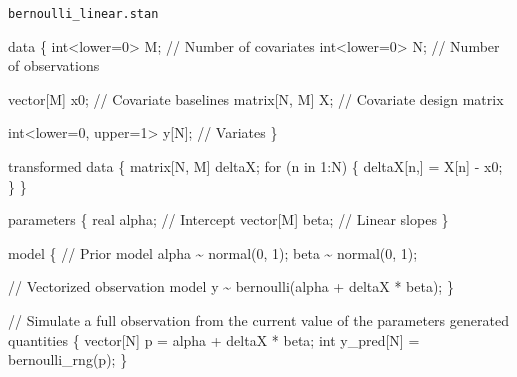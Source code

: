 \documentclass[
  letterpaper,
  DIV=11,
  numbers=noendperiod]{scrartcl}
\newenvironment{Shaded}{\begin{snugshade}}{\end{snugshade}}
\newcommand{\CommentTok}[1]{\textcolor[rgb]{0.37,0.37,0.37}{#1}}
\newcommand{\ControlFlowTok}[1]{\textcolor[rgb]{0.00,0.23,0.31}{#1}}
\newcommand{\DataTypeTok}[1]{\textcolor[rgb]{0.68,0.00,0.00}{#1}}
\newcommand{\DecValTok}[1]{\textcolor[rgb]{0.68,0.00,0.00}{#1}}
\newcommand{\KeywordTok}[1]{\textcolor[rgb]{0.00,0.23,0.31}{#1}}
\newcommand{\NormalTok}[1]{\textcolor[rgb]{0.00,0.23,0.31}{#1}}
\begin{document}
\begin{codelisting}

\caption{\texttt{bernoulli\_linear.stan}}

\begin{Shaded}
\begin{Highlighting}[]
\KeywordTok{data}\NormalTok{ \{}
  \DataTypeTok{int}\NormalTok{\textless{}}\KeywordTok{lower}\NormalTok{=}\DecValTok{0}\NormalTok{\textgreater{} M; }\CommentTok{// Number of covariates}
  \DataTypeTok{int}\NormalTok{\textless{}}\KeywordTok{lower}\NormalTok{=}\DecValTok{0}\NormalTok{\textgreater{} N; }\CommentTok{// Number of observations}
  
  \DataTypeTok{vector}\NormalTok{[M] x0;   }\CommentTok{// Covariate baselines}
  \DataTypeTok{matrix}\NormalTok{[N, M] X; }\CommentTok{// Covariate design matrix}
  
  \DataTypeTok{int}\NormalTok{\textless{}}\KeywordTok{lower}\NormalTok{=}\DecValTok{0}\NormalTok{, }\KeywordTok{upper}\NormalTok{=}\DecValTok{1}\NormalTok{\textgreater{} y[N]; }\CommentTok{// Variates}
\NormalTok{\}}

\KeywordTok{transformed data}\NormalTok{ \{}
  \DataTypeTok{matrix}\NormalTok{[N, M] deltaX;}
  \ControlFlowTok{for}\NormalTok{ (n }\ControlFlowTok{in} \DecValTok{1}\NormalTok{:N) \{}
\NormalTok{    deltaX[n,] = X[n] {-} x0\textquotesingle{};}
\NormalTok{  \}}
\NormalTok{\}}

\KeywordTok{parameters}\NormalTok{ \{}
  \DataTypeTok{real}\NormalTok{ alpha;      }\CommentTok{// Intercept}
  \DataTypeTok{vector}\NormalTok{[M] beta;  }\CommentTok{// Linear slopes}
\NormalTok{\}}

\KeywordTok{model}\NormalTok{ \{}
  \CommentTok{// Prior model}
\NormalTok{  alpha \textasciitilde{} normal(}\DecValTok{0}\NormalTok{, }\DecValTok{1}\NormalTok{);}
\NormalTok{  beta \textasciitilde{} normal(}\DecValTok{0}\NormalTok{, }\DecValTok{1}\NormalTok{);}

  \CommentTok{// Vectorized observation model}
\NormalTok{  y \textasciitilde{} bernoulli(alpha + deltaX * beta);}
\NormalTok{\}}

\CommentTok{// Simulate a full observation from the current value of the parameters}
\KeywordTok{generated quantities}\NormalTok{ \{}
  \DataTypeTok{vector}\NormalTok{[N] p = alpha + deltaX * beta;}
  \DataTypeTok{int}\NormalTok{ y\_pred[N] = bernoulli\_rng(p);}
\NormalTok{\}}
\end{Highlighting}
\end{Shaded}

\end{codelisting}
\end{document}
